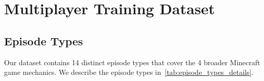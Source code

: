 \section{Multiplayer Training Dataset}
\label{sec:appendix_train_dset}
\subsection{Episode Types}
\label{subsec:appendix_episode_types}

Our dataset contains 14 distinct episode types that cover the 4 broader Minecraft game mechanics. We describe the episode types in~\cref{tab:episode_types_details}.


\begin{table}[h]
\centering
\small
{}

\caption{Episode types in our training dataset.}
\label{tab:episode_types_details}


\end{table}
